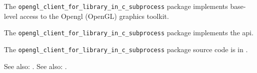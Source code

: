 
The {\tt opengl\_client\_for\_library\_in\_c\_subprocess} package implements base-level access to the Opengl (OpenGL) graphics 
toolkit.

The {\tt opengl\_client\_for\_library\_in\_c\_subprocess} package implements the  api.

The {\tt opengl\_client\_for\_library\_in\_c\_subprocess} package source code is in .

See also:  .
See also:  .


